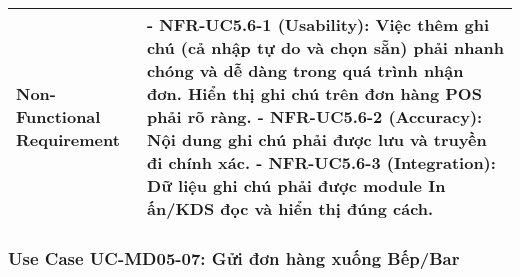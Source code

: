 \begin{longtable}{|m{4cm}|p{11cm}|}
\hline
Non-Functional Requirement & - \textbf{NFR-UC5.6-1 (Usability):} Việc thêm ghi chú (cả nhập tự do và chọn sẵn) phải nhanh chóng và dễ dàng trong quá trình nhận đơn. Hiển thị ghi chú trên đơn hàng POS phải rõ ràng. \newline - \textbf{NFR-UC5.6-2 (Accuracy):} Nội dung ghi chú phải được lưu và truyền đi chính xác. \newline - \textbf{NFR-UC5.6-3 (Integration):} Dữ liệu ghi chú phải được module In ấn/KDS đọc và hiển thị đúng cách. \\
\hline
\end{longtable}

\subsubsection{Use Case UC-MD05-07: Gửi đơn hàng xuống Bếp/Bar}

